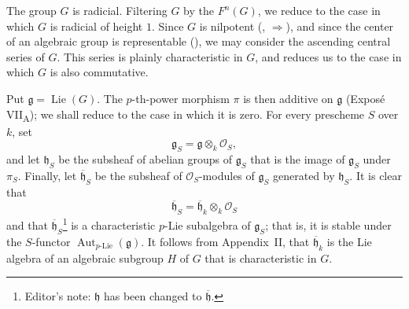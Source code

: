 


The group \(G\) is radicial.  Filtering \(G\) by the \(F^n(G)\), we
reduce to the case in which \(G\) is radicial of height \(1\).
Since \(G\) is nilpotent (, \(\Rightarrow\)), and since
the center of an algebraic group is representable
(), we may consider the ascending central series
of \(G\).  This series is plainly characteristic in \(G\), and
reduces us to the case in which \(G\) is also commutative.

Put \(\mathfrak g=\operatorname{Lie}(G)\).  The \(p\)-th-power
morphism \(\pi\) is then additive on \(\mathfrak g\)
(Exposé VII\textsubscript{A}); we shall reduce to the case in which
it is zero.  For every prescheme \(S\) over \(k\), set
\[
  \mathfrak g_S=\mathfrak g\otimes_k\mathcal O_S,
\]
and let \(\mathfrak h_S\) be the subsheaf of abelian groups of
\(\mathfrak g_S\) that is the image of \(\mathfrak g_S\) under
\(\pi_S\).  Finally, let \(\overline{\mathfrak h}_S\) be the
subsheaf of \(\mathcal O_S\)-modules of \(\mathfrak g_S\) generated
by \(\mathfrak h_S\).  It is clear that
\[
  \overline{\mathfrak h}_S
  =\overline{\mathfrak h}_k\otimes_k\mathcal O_S
\]
and that \(\overline{\mathfrak h}_S\)\footnote[4]{Editor's note:
\(\mathfrak h\) has been changed to \(\overline{\mathfrak h}\).}
is a characteristic \(p\)-Lie subalgebra of \(\mathfrak g_S\);
that is, it is stable under the \(S\)-functor
\(\operatorname{Aut}_{p\text{-}\mathrm{Lie}}(\mathfrak g)\).
It follows from Appendix~II,  that
\(\overline{\mathfrak h}_k\) is the Lie algebra of an algebraic
subgroup \(H\) of \(G\) that is characteristic in \(G\).

